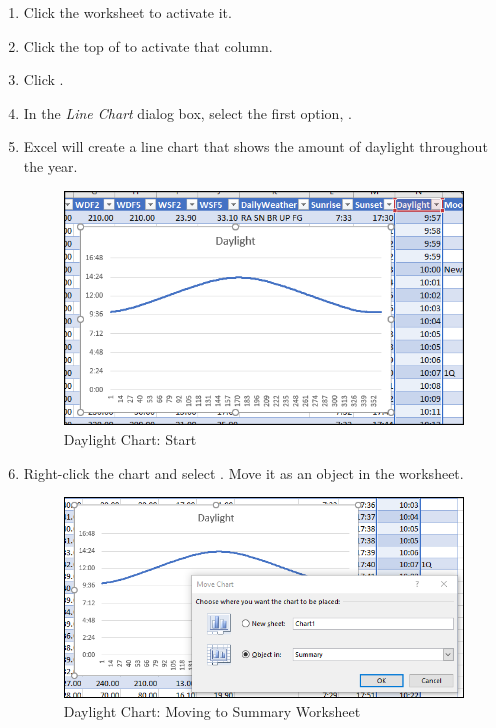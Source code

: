 \begin{enumbox}
	\begin{enumerate}
		\item Click the  worksheet to activate it.
		\item Click the top of  to activate that column.
		\item Click .
		\item In the \textit{Line Chart} dialog box, select the first option, .
		\item Excel will create a line chart that shows the amount of daylight throughout the year. 
		
		\begin{figure}[H]
			\centering
			\includegraphics[width=\maxwidth{.95\linewidth}]{gfx/ch09_fig88}
			\caption{Daylight Chart: Start}
			\label{09:fig88}
		\end{figure}
		
		\item Right-click the chart and select . Move it as an object in the  worksheet.
	
		\begin{figure}[H]
			\centering
			\includegraphics[width=\maxwidth{.95\linewidth}]{gfx/ch09_fig89}
			\caption{Daylight Chart: Moving to Summary Worksheet}
			\label{09:fig89}
		\end{figure}
	

\end{enumerate}
\end{enumbox}
